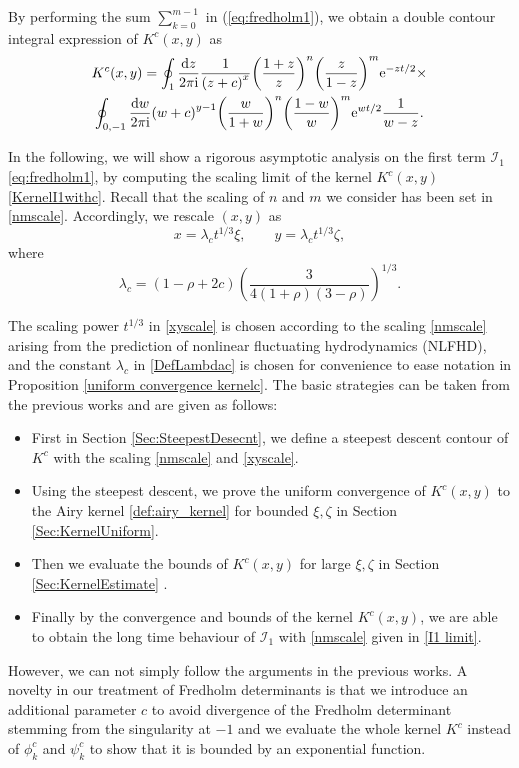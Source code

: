\documentclass[cmp]{svjour}
\numberwithin{theorem}{section}
\numberwithin{equation}{section}
\def\ii{{\rm i}}
\begin{document}
By performing the sum $\sum_{k=0}^{m-1}$ in (\ref{eq:fredholm1}), we obtain a double contour integral expression of $K^c(x,y)$ as
\begin{multline}\label{KernelI1withc}
	K^c(x, y)  = \oint_1 \frac{\mathrm{d} z}{2 \pi \ii} \frac{1}{{\left( z + c \right)}^x} {\left( \frac{1 + z}{z} \right)}^n {\left( \frac{z}{1 - z} \right)}^m  \mathrm{e}^{ - z t/2 } \times \\\oint_{0 , -1} \frac{\mathrm{d} w}{2 \pi \ii} {\left( w + c \right)}^{y-1}  {\left( \frac{w}{1 + w} \right)}^n {\left( \frac{1 - w}{w} \right)}^m \mathrm{e}^{ w t /2 } \frac{1}{w - z}.
\end{multline}


In the following, we will show a rigorous asymptotic analysis on the first term $\mathcal{I}_1$ \eqref{eq:fredholm1}, by computing the scaling limit of the kernel $K^c(x, y)$ \eqref{KernelI1withc}.  Recall that the scaling of $n$ and $m$ we consider has been set in \eqref{nmscale}. Accordingly, we rescale $(x,y)$ as
\begin{equation}\label{xyscale}
	x=\lambda_ct^{1/3}\xi, \qquad y=\lambda_ct^{1/3}\zeta,
\end{equation}
where 
\begin{equation}\label{DefLambdac}
	\lambda_c = (1 - \rho + 2c ) {\left( \frac{3}{4 (1 + \rho) (3 - \rho)} \right)}^{1/3}.
\end{equation}

The scaling power $t^{1/3}$ in \eqref{xyscale} is chosen according to the scaling \eqref{nmscale} arising from the prediction of nonlinear fluctuating hydrodynamics (NLFHD), and the constant $\lambda_c$ in \eqref{DefLambdac} is chosen for convenience to ease notation in Proposition \ref{uniform convergence kernelc}. 
The basic strategies can be taken from the previous works \cite{borodin2008transition,BFPS2007} and are given as follows:

\begin{itemize}
	\item First in Section \ref{Sec:SteepestDesecnt}, we define a steepest descent contour of $K^c$ with the scaling \eqref{nmscale} and \eqref{xyscale}.
	\item Using the steepest descent, we prove the uniform convergence of $K^c(x, y)$ to the Airy kernel \eqref{def:airy_kernel} for bounded $\xi,\zeta$ in Section \ref{Sec:KernelUniform}.
	\item Then we evaluate the bounds of $K^c(x, y)$ for large $\xi, \zeta$ in Section \ref{Sec:KernelEstimate} .
	\item Finally by the convergence and bounds of the kernel $K^c(x, y)$, we are able to obtain the long time behaviour of $\mathcal{I}_1$ with \eqref{nmscale} given in \eqref{I1 limit}.
\end{itemize}
However, we can not simply follow the arguments in the previous works. A novelty in our treatment of Fredholm determinants is that  
we introduce an additional parameter $c$ to avoid divergence of the Fredholm determinant stemming from the singularity at $-1$ and we evaluate the whole kernel $K^c$ instead of $\phi^c_k$ and $\psi^c_k$ to show that it is bounded by an exponential function.
\end{document}
